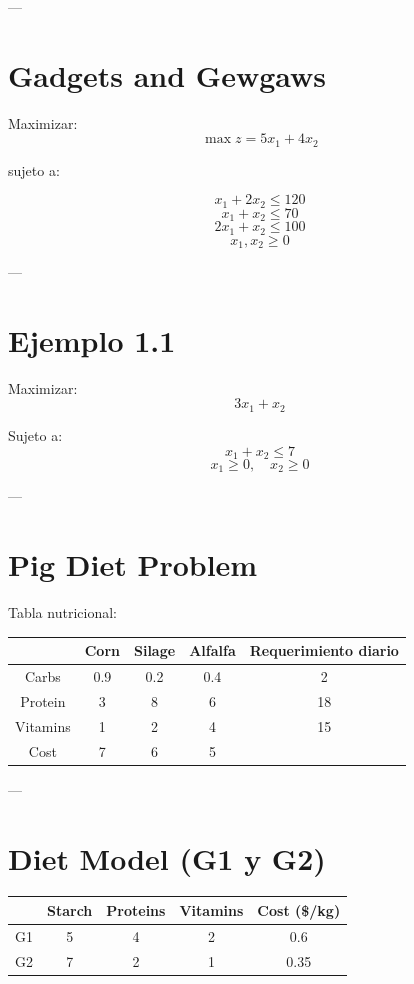 \documentclass[12pt]{article}
\begin{document}
---

\section*{Gadgets and Gewgaws}

Maximizar:
\[
\max z = 5x_1 + 4x_2
\]

sujeto a:

\[
x_1 + 2x_2 \leq 120
\]
\[
x_1 + x_2 \leq 70
\]
\[
2x_1 + x_2 \leq 100
\]
\[
x_1, x_2 \geq 0
\]

---

\section*{Ejemplo 1.1}

Maximizar:
\[
3x_1 + x_2
\]

Sujeto a:
\[
x_1 + x_2 \leq 7
\]
\[
x_1 \geq 0, \quad x_2 \geq 0
\]

---

\section*{Pig Diet Problem}

Tabla nutricional:

\begin{center}
\begin{tabular}{|c|c|c|c|c|}
\hline
 & Corn & Silage & Alfalfa & Requerimiento diario \\
\hline
Carbs & 0.9 & 0.2 & 0.4 & 2 \\
Protein & 3 & 8 & 6 & 18 \\
Vitamins & 1 & 2 & 4 & 15 \\
Cost & 7 & 6 & 5 & \\
\hline
\end{tabular}
\end{center}

---

\section*{Diet Model (G1 y G2)}

\begin{center}
\begin{tabular}{|c|c|c|c|c|}
\hline
 & Starch & Proteins & Vitamins & Cost (\$/kg) \\
\hline
G1 & 5 & 4 & 2 & 0.6 \\
G2 & 7 & 2 & 1 & 0.35 \\
\hline
\end{tabular}
\end{center}
\end{document}
